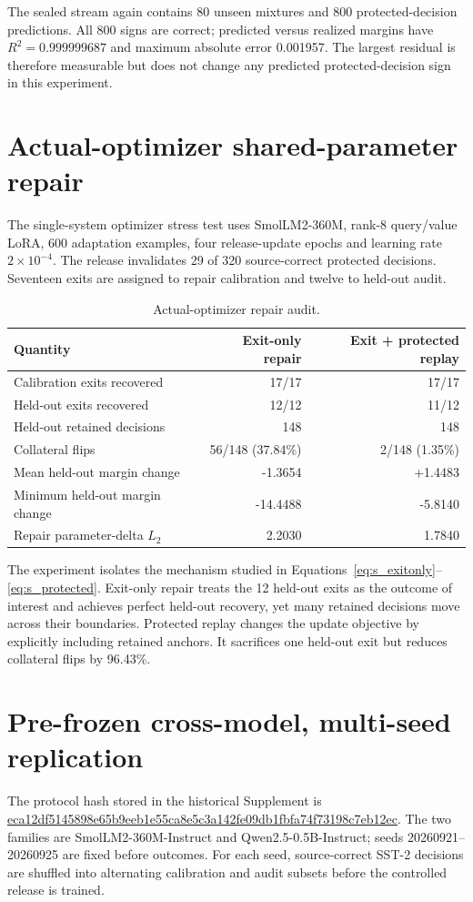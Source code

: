 \documentclass[11pt,letterpaper]{article}
\theoremstyle{plain}
\newcommand{\1}{\mathbf 1}
\begin{document}
The sealed stream again contains 80 unseen mixtures and 800 protected-decision predictions. All 800 signs are correct; predicted versus realized margins have $R^2=0.999999687$ and maximum absolute error 0.001957. The largest residual is therefore measurable but does not change any predicted protected-decision sign in this experiment.

\section{Actual-optimizer shared-parameter repair}
The single-system optimizer stress test uses SmolLM2-360M, rank-8 query/value LoRA, 600 adaptation examples, four release-update epochs and learning rate $2\times10^{-4}$. The release invalidates 29 of 320 source-correct protected decisions. Seventeen exits are assigned to repair calibration and twelve to held-out audit.

\begin{table}[H]
\centering
\caption{Actual-optimizer repair audit.}
\label{tab:s_optimizer}
\begin{tabular}{lrr}
\toprule
Quantity & Exit-only repair & Exit + protected replay \\
\midrule
Calibration exits recovered & 17/17 & 17/17 \\
Held-out exits recovered & 12/12 & 11/12 \\
Held-out retained decisions & 148 & 148 \\
Collateral flips & 56/148 (37.84\%) & 2/148 (1.35\%) \\
Mean held-out margin change & -1.3654 & +1.4483 \\
Minimum held-out margin change & -14.4488 & -5.8140 \\
Repair parameter-delta $L_2$ & 2.2030 & 1.7840 \\
\bottomrule
\end{tabular}
\end{table}

The experiment isolates the mechanism studied in Equations~\ref{eq:s_exitonly}--\ref{eq:s_protected}. Exit-only repair treats the 12 held-out exits as the outcome of interest and achieves perfect held-out recovery, yet many retained decisions move across their boundaries. Protected replay changes the update objective by explicitly including retained anchors. It sacrifices one held-out exit but reduces collateral flips by 96.43\%.

\section{Pre-frozen cross-model, multi-seed replication}
The protocol hash stored in the historical Supplement is \url{eca12df5145898e65b9eeb1e55ca8e5c3a142fe09db1fbfa74f73198c7eb12ec}. The two families are SmolLM2-360M-Instruct and Qwen2.5-0.5B-Instruct; seeds 20260921--20260925 are fixed before outcomes. For each seed, source-correct SST-2 decisions are shuffled into alternating calibration and audit subsets before the controlled release is trained.
\end{document}
